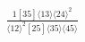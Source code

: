 \documentclass[varwidth, border=5pt]{standalone}
\begin{document}
\begin{my}
$\begin{gathered}
\scriptscriptstyle\frac{1[35]⟨13⟩⟨24⟩^2}{⟨12⟩^2[25]⟨35⟩⟨45⟩}
\end{gathered}$
\end{my}
\end{document}
